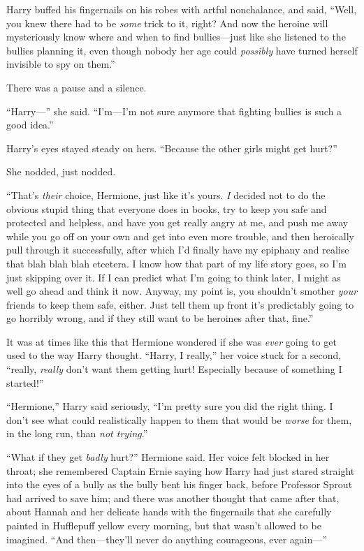 Harry buffed his fingernails on his robes with artful nonchalance, and
said, ``Well, you knew there had to be \emph{some} trick to it, right?
And now the heroine will mysteriously know where and when to find
bullies---just like she listened to the bullies planning it, even though
nobody her age could \emph{possibly} have turned herself invisible to
spy on them.''

There was a pause and a silence.

``Harry---'' she said. ``I'm---I'm not sure anymore that fighting
bullies is such a good idea.''

Harry's eyes stayed steady on hers. ``Because the other girls might get
hurt?''

She nodded, just nodded.

``That's \emph{their} choice, Hermione, just like it's yours. \emph{I}
decided not to do the obvious stupid thing that everyone does in books,
try to keep you safe and protected and helpless, and have you get really
angry at me, and push me away while you go off on your own and get into
even more trouble, and then heroically pull through it successfully,
after which I'd finally have my epiphany and realise that blah blah blah
etcetera. I know how that part of my life story goes, so I'm just
skipping over it. If I can predict what I'm going to think later, I
might as well go ahead and think it now. Anyway, my point is, you
shouldn't smother \emph{your} friends to keep them safe, either. Just
tell them up front it's predictably going to go horribly wrong, and if
they still want to be heroines after that, fine.''

It was at times like this that Hermione wondered if she was \emph{ever}
going to get used to the way Harry thought. ``Harry, I really,'' her
voice stuck for a second, ``really, \emph{really} don't want them
getting hurt! Especially because of something I started!''

``Hermione,'' Harry said seriously, ``I'm pretty sure you did the right
thing. I don't see what could realistically happen to them that would be
\emph{worse} for them, in the long run, than \emph{not trying}.''

``What if they get \emph{badly} hurt?'' Hermione said. Her voice felt
blocked in her throat; she remembered Captain Ernie saying how Harry had
just stared straight into the eyes of a bully as the bully bent his
finger back, before Professor Sprout had arrived to save him; and there
was another thought that came after that, about Hannah and her delicate
hands with the fingernails that she carefully painted in Hufflepuff
yellow every morning, but that wasn't allowed to be imagined. ``And
then---they'll never do anything courageous, ever again---''

